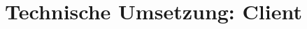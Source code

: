 \hypertarget{technische-umsetzung-client}{%
\section{Technische Umsetzung:
Client}\label{technische-umsetzung-client}}
